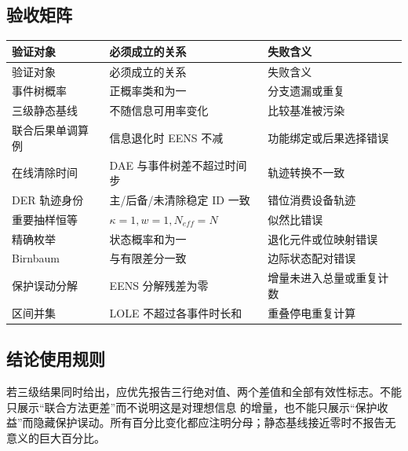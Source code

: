 \subsection{验收矩阵}
\begingroup\footnotesize
\begin{longtable}{@{}L{4.1cm}L{5.1cm}L{5.1cm}@{}}
\toprule
验证对象 & 必须成立的关系 & 失败含义\\
\midrule
\endfirsthead
\toprule
验证对象 & 必须成立的关系 & 失败含义\\
\midrule
\endhead
\bottomrule
\endfoot
事件树概率 & 正概率类和为一 & 分支遗漏或重复\\
三级静态基线 & 不随信息可用率变化 & 比较基准被污染\\
联合后果单调算例 & 信息退化时 EENS 不减 & 功能绑定或后果选择错误\\
在线清除时间 & DAE 与事件树差不超过时间步 & 轨迹转换不一致\\
DER 轨迹身份 & 主/后备/未清除稳定 ID 一致 & 错位消费设备轨迹\\
重要抽样恒等 & $\kappa=1,w=1,N_{eff}=N$ & 似然比错误\\
精确枚举 & 状态概率和为一 & 退化元件或位映射错误\\
Birnbaum & 与有限差分一致 & 边际状态配对错误\\
保护误动分解 & EENS 分解残差为零 & 增量未进入总量或重复计数\\
区间并集 & LOLE 不超过各事件时长和 & 重叠停电重复计算\\
\end{longtable}
\endgroup

\subsection{结论使用规则}
若三级结果同时给出，应优先报告三行绝对值、两个差值和全部有效性标志。不能只展示“联合方法更差”而不说明这是对理想信息
的增量，也不能只展示“保护收益”而隐藏保护误动。所有百分比变化都应注明分母；静态基线接近零时不报告无意义的巨大百分比。
